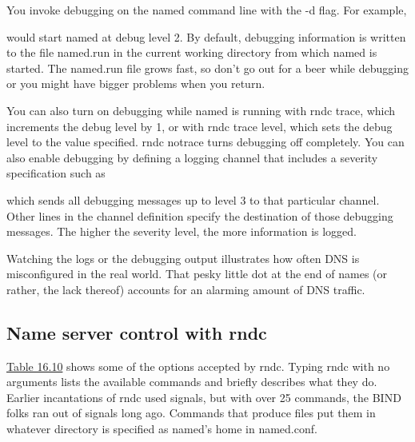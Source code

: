 You invoke debugging on the {named} command line with the {-d} flag. For
example,


would start {named} at debug level 2. By default, debugging information
is written to the file {named.run} in the current working directory from
which {named} is started. The {named.run} file grows fast, so don't go
out for a beer while debugging or you might have bigger problems when
you return.

You can also turn on debugging while {named} is running with {rndc
trace}, which increments the debug level by 1, or with {rndc trace
}{level,}{ }which sets the debug level to the value specified. {rndc
notrace} turns debugging off completely. You can also enable debugging
by defining a logging channel that includes a severity specification
such as


which sends all debugging messages up to level 3 to that particular
channel. Other lines in the channel definition specify the destination
of those debugging messages. The higher the severity level, the more
information is logged.

Watching the logs or the debugging output illustrates how often DNS is
misconfigured in the real world. That pesky little dot at the end of
names (or rather, the lack thereof) accounts for an alarming amount of
DNS traffic.

\protect\hypertarget{part0024_split_071.html}{}{}

\hypertarget{part0024_split_071.htmlux5cux23_idContainer1069}{}
\hypertarget{part0024_split_071.htmlux5cux23calibre_pb_70}{%
\subsection[Name server control with
{rndc}]{\texorpdfstring{\protect\hypertarget{part0024_split_071.htmlux5cux23_idTextAnchor964}{}{}\protect\hypertarget{part0024_split_071.htmlux5cux23_idIndexMarker2292}{}{}Name
server control with
{rndc}}{Name server control with rndc}}\label{part0024_split_071.htmlux5cux23calibre_pb_70}}

\protect\hyperlink{part0024_split_071.htmlux5cux23_idTextAnchor965}{Table
16.10} shows some of the options accepted by {rndc}. Typing {rndc} with
no arguments lists the available commands and briefly describes what
they do. Earlier incantations of {rndc} used signals, but with over 25
commands, the BIND folks ran out of signals long ago. Commands that
produce files put them in whatever directory is specified as {named}'s
home in {named.conf}.

